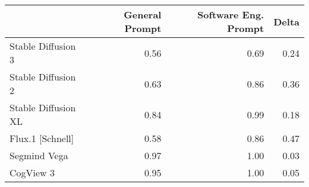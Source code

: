 \begin{tabular}{lrrr}
\toprule
 & General Prompt & Software Eng. Prompt & Delta \\
\midrule
Stable Diffusion 3 & 0.56 & 0.69 & 0.24 \\
Stable Diffusion 2 & 0.63 & 0.86 & 0.36 \\
Stable Diffusion XL & 0.84 & 0.99 & 0.18 \\
Flux.1 [Schnell] & 0.58 & 0.86 & 0.47 \\
Segmind Vega & 0.97 & 1.00 & 0.03 \\
CogView 3 & 0.95 & 1.00 & 0.05 \\
\bottomrule
\end{tabular}
